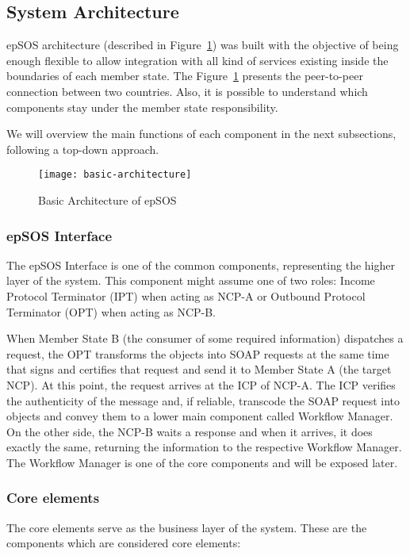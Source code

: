 \subsection{System Architecture}

epSOS architecture (described in Figure~\ref{fig:epsos-architecture}) was built with the objective of being enough flexible to allow integration with all kind of services existing inside the boundaries of each member state. The Figure~\ref{fig:epsos-architecture} presents the peer-to-peer connection between two countries. Also, it is possible to understand which components stay under the member state responsibility.

We will overview the main functions of each component in the next subsections, following a top-down approach.

\begin{figure}[t]
\texttt{[image: basic-architecture]}
\caption[Basic Architecture of epSOS]{Basic Architecture of epSOS~\citep{EpSOS}}
\label{fig:epsos-architecture}
\end{figure}

\subsubsection{epSOS Interface}
The epSOS Interface is one of the common components, representing the higher layer of the system. This component might assume one of two roles: Income Protocol Terminator (IPT) when acting as NCP-A or Outbound Protocol Terminator (OPT) when acting as NCP-B.

When Member State B (the consumer of some required information) dispatches a request, the OPT transforms the objects into SOAP requests at the same time that signs and certifies that request and send it to Member State A (the target NCP). At this point, the request arrives at the ICP of NCP-A. The ICP verifies the authenticity of the message and, if reliable, transcode the SOAP request into objects and convey them to a lower main component called Workflow Manager. On the other side, the NCP-B waits a response and when it arrives, it does exactly the same, returning the information to the respective Workflow Manager. The Workflow Manager is one of the core components and will be exposed later.

\subsubsection{Core elements}
The core elements serve as the business layer of the system. These are the components which are considered core elements:

